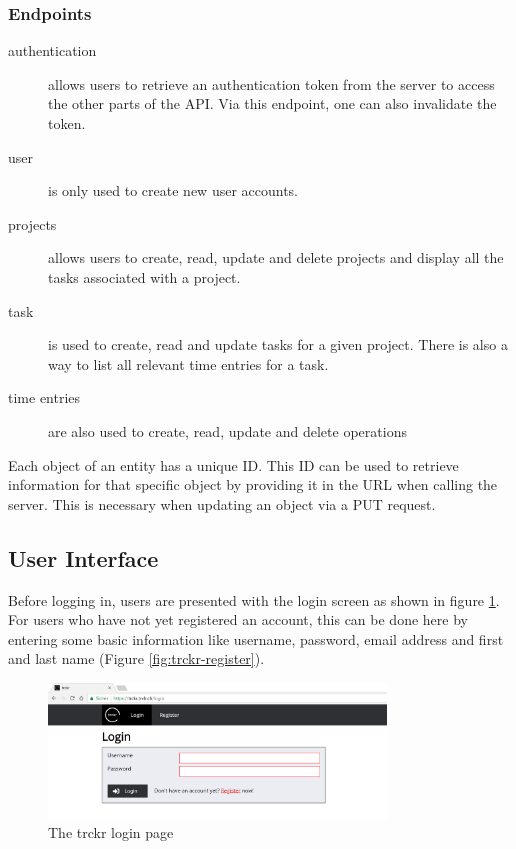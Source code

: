 \documentclass[bibliography=totoc, listof=totocnumbered]{scrartcl}
\begin{document}
\subsubsection{Endpoints}
\begin{description}
\item[authentication] allows users to retrieve an authentication token from the
  server to access the other parts of the API. Via this endpoint, one can also
  invalidate the token.
\item[user] is only used to create new user accounts.
\item[projects] allows users to create, read, update and delete projects and
  display all the tasks associated with a project.
\item[task] is used to create, read and update tasks for a given project. There
  is also a way to list all relevant time entries for a task.
\item[time entries] are also used to create, read, update and delete operations
\end{description}

Each object of an entity has a unique ID. This ID can be used to retrieve
information for that specific object by providing it in the URL when calling the
server. This is necessary when updating an object via a PUT request.

\subsection{User Interface}
Before logging in, users are presented with the login screen as shown in figure
\ref{fig:trckr-login}. For users who have not yet registered an account, this
can be done here by entering some basic information like username, password,
email address and first and last name (Figure \ref{fig:trckr-register}).

\begin{figure}[h]
    \includegraphics[width=0.8\textwidth]{trckr-login}
    \caption{The trckr login page}
    \label{fig:trckr-login}
\end{figure}
\end{document}
